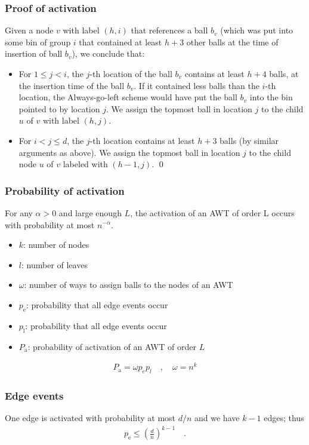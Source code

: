 \documentclass[professionalfonts]{beamer}
\begin{document}
\begin{frame}
\frametitle{Proof of activation}
Given a node $v$ with label $(h,i)$ that references a ball $b_v$ (which was put into some bin of group $i$ that contained at least $h+3$ other balls at the time of insertion of ball $b_v$), \alert{we conclude} that:
\begin{itemize}
\item For $1\leq j < i$, the $j$-th location of the ball $b_v$ contains at least $h+4$ balls, at the insertion time of the ball $b_v$. If it contained less balls than the $i$-th location, the Always-go-left scheme would have put the ball $b_v$ into the bin pointed to by location $j$. We assign the topmost ball in location $j$ to the child $u$ of $v$ with label $(h,j)$. 
\item For $i < j \leq d$, the $j$-th location contains at least $h+3$ balls (by similar arguments as above). We assign the topmost ball in location $j$ to the child node $u$ of $v$ labeled with $(h-1, j)$. \qed
\end{itemize}
\end{frame}


\begin{frame}
\frametitle{Probability of activation}
\begin{lemma}
For any $\alpha > 0$ and large enough $L$, the activation of an AWT of order L occurs with probability at most $n^{-\alpha}$.
\end{lemma}
\medskip
\begin{itemize}
\item $k$: number of nodes
\item $l$: number of leaves
\item $\omega$: number of ways to assign balls to the nodes of an AWT
\item $p_\mathrm{e}$: probability that all edge events occur
\item $p_\mathrm{l}$: probability that all edge events occur
\item $P_\mathrm{a}$: probability of activation of an AWT of order $L$
\end{itemize}

\begin{align*}
P_\mathrm{a} = \omega p_e p_l \quad , \quad \omega = n^k 
\end{align*}
\end{frame}

\begin{frame}
\frametitle{Edge events}
\bigskip
One edge is activated with probability at most $d/n$ and we have $k-1$ edges; thus
\begin{align*}
p_\mathrm{e} \leq \left(\frac{d}{n}\right)^{k-1} \quad .
\end{align*}
\end{frame}
\end{document}
